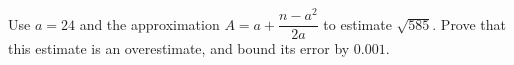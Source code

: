 Use $a=24$ and the approximation $A=a+\dfrac{n-a^2}{2a}$ to estimate $\sqrt{585}$. Prove that this estimate is an overestimate, and bound its error by $0.001$.
